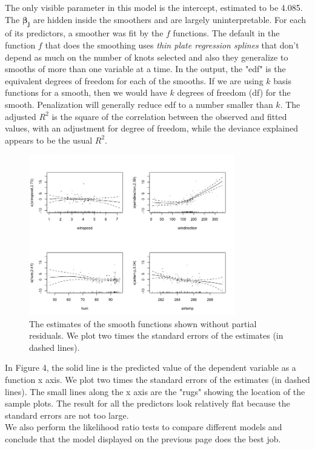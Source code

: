 \documentclass[10pt]{article}
\begin{document}
The only visible parameter in this model is the intercept, estimated to be 4.085. The ${\bm{\beta_{j}}}$ are hidden inside the smoothers and are largely uninterpretable. For each of its predictors, a smoother was fit by the $f$ functions. The default in the function $f$ that does the smoothing uses {\textit{thin plate regression splines}} that don't depend as much on the number of knots selected and also they generalize to smooths of more than one variable at a time. In the output, the "edf" is the equivalent degrees of freedom for each of the smooths. If we are using $k$ basis functions for a smooth, then we would have $k$ degrees of freedom (df) for the smooth. Penalization will generally reduce edf to a number smaller than $k$. The adjusted $R^{2}$ is the square of the correlation between the observed and fitted values, with an adjustment for degree of freedom, while the deviance explained appears to be the usual $R^2$. 



\begin{figure}[h]

\centering
\includegraphics[width=0.8\textwidth]{pred.jpeg} 
\caption{The estimates of the smooth functions shown without partial residuals. We plot two times the standard errors of the estimates (in dashed lines).} 
\end{figure} 
In Figure 4, the solid line is the predicted value of the dependent variable as a function x axis. We plot two times the standard errors of the estimates (in dashed lines). The small lines along the x axis are the "rugs" showing the location of the sample plots. The result for all the predictors look relatively flat because the standard errors are not too large. \\ 
We also perform the likelihood ratio tests to compare different models and conclude that the model displayed on the previous page does the best job. 
\end{document}
